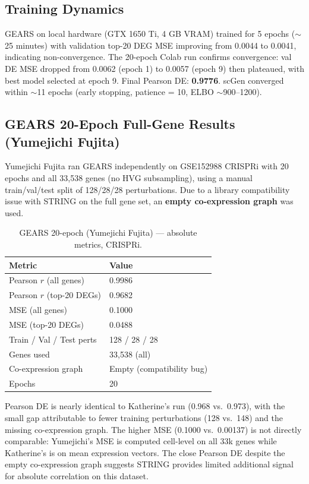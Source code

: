 \documentclass[11pt,letterpaper]{article}
\begin{document}
\subsection{Training Dynamics}

GEARS on local hardware (GTX 1650 Ti, 4 GB VRAM) trained for 5 epochs ($\sim$25 minutes) with
validation top-20 DEG MSE improving from 0.0044 to 0.0041, indicating non-convergence. The
20-epoch Colab run confirms convergence: val DE MSE dropped from 0.0062 (epoch 1) to 0.0057
(epoch 9) then plateaued, with best model selected at epoch 9. Final Pearson DE: \textbf{0.9776}.
scGen converged within $\sim$11 epochs (early stopping, patience = 10, ELBO $\sim$900--1200).

\subsection{GEARS 20-Epoch Full-Gene Results (Yumejichi Fujita)}

Yumejichi Fujita ran GEARS independently on GSE152988 CRISPRi with 20 epochs and all 33,538
genes (no HVG subsampling), using a manual train/val/test split of 128/28/28 perturbations.
Due to a library compatibility issue with STRING on the full gene set, an \textbf{empty
co-expression graph} was used.

\begin{table}[h]
\centering
\caption{GEARS 20-epoch (Yumejichi Fujita) --- absolute metrics, CRISPRi.}
\small
\begin{tabular}{ll}
\toprule
Metric & Value \\
\midrule
Pearson $r$ (all genes)    & 0.9986 \\
Pearson $r$ (top-20 DEGs)  & 0.9682 \\
MSE (all genes)            & 0.1000 \\
MSE (top-20 DEGs)          & 0.0488 \\
Train / Val / Test perts   & 128 / 28 / 28 \\
Genes used                 & 33,538 (all) \\
Co-expression graph        & Empty (compatibility bug) \\
Epochs                     & 20 \\
\bottomrule
\end{tabular}
\end{table}

Pearson DE is nearly identical to Katherine's run (0.968 vs.\ 0.973), with the small gap
attributable to fewer training perturbations (128 vs.\ 148) and the missing co-expression graph.
The higher MSE (0.1000 vs.\ 0.00137) is not directly comparable: Yumejichi's MSE is computed
cell-level on all 33k genes while Katherine's is on mean expression vectors. The close Pearson DE
despite the empty co-expression graph suggests STRING provides limited additional signal for
absolute correlation on this dataset.
\end{document}
